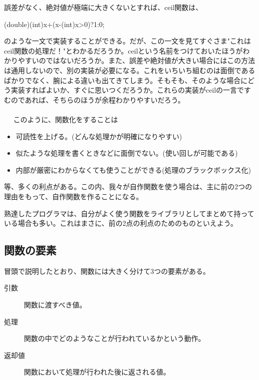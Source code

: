 誤差がなく、絶対値が極端に大きくないとすれば、ceil関数は、
\begin{code}
(double)(int)x+(x-(int)x>0)?1:0;
\end{code}
のような一文で実装することができる。だが、この一文を見てすぐさま"これはceil関数の処理だ！"とわかるだろうか。ceilという名前をつけておいたほうがわかりやすいのではないだろうか。また、誤差や絶対値が大きい場合にはこの方法は通用しないので、別の実装が必要になる。これをいちいち組むのは面倒であるばかりでなく、腕による違いも出てきてしまう。そもそも、そのような場合にどう実装すればよいか、すぐに思いつくだろうか。これらの実装がceilの一言ですむのであれば、そちらのほうが余程わかりやすいだろう。
\\ \\　
このように、関数化をすることは
\begin{itemize}
\item 可読性を上げる。(どんな処理かが明確になりやすい)
\item 似たような処理を書くときなどに面倒でない。(使い回しが可能である)
\item 内部が厳密にわからなくても使うことができる(処理のブラックボックス化)
\end{itemize}
等、多くの利点がある。この内、我々が自作関数を使う場合は、主に前の2つの理由をもって、自作関数を作ることになる。

熟達したプログラマは、自分がよく使う関数をライブラリとしてまとめて持っている場合も多い。これはまさに、前の2点の利点のためのものといえよう。

\subsection{関数の要素}
冒頭で説明したとおり、関数には大きく分けて3つの要素がある。
\begin{description}
\item[引数] 関数に渡すべき値。
\item[処理] 関数の中でどのようなことが行われているかという動作。
\item[返却値] 関数において処理が行われた後に返される値。
\end{description}

